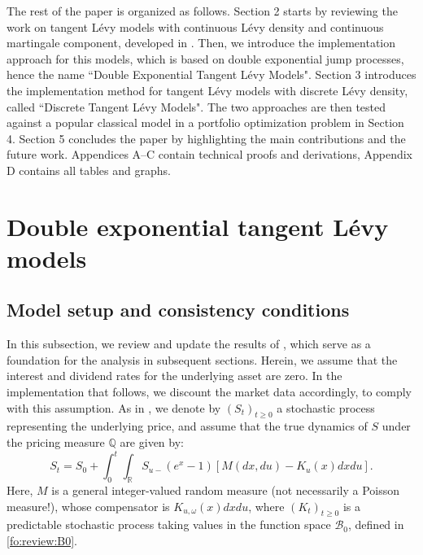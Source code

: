 \documentclass{article}
\numberwithin{equation}{section}
\newcommand\RR {\mathbb R}
\newcommand\QQ {\mathbb Q}
\begin{document}
The rest of the paper is organized as follows. Section 2 starts by reviewing the work on tangent L\'{e}vy models with continuous L\'evy density and continuous martingale component, developed in \cite{carmona2011tangentlevy}. Then, we introduce the implementation approach for this models, which is based on double exponential jump processes, hence the name ``Double Exponential Tangent L\'{e}vy Models". Section 3 introduces the implementation method for tangent L\'{e}vy models with discrete L\'evy density, called ``Discrete Tangent L\'{e}vy Models". The two approaches are then tested against a popular classical model in a portfolio optimization problem in Section 4. Section 5 concludes the paper by highlighting the main contributions and the future work. Appendices A--C contain technical proofs and derivations, Appendix D contains all tables and graphs.








\section{Double exponential tangent L\'{e}vy models}\label{sec:DETLM}


\subsection{Model setup and consistency conditions}\label{sec:nosym}

In this subsection, we review and update the results of \cite{carmona2010tangentlevy}, which serve as a foundation for the analysis in subsequent sections. 
Herein, we assume that the interest and dividend rates for the underlying asset are zero. In the implementation that follows, we discount the market data accordingly, to comply with this assumption. As in \cite{carmona2011tangentlevy}, we denote by $(S_t)_{t\ge 0}$ a stochastic process representing the underlying price, and assume that the true dynamics of $S$ under the pricing measure $\QQ$ are given by:
\begin{equation}
\label{fo:nosym:Sdynamics}
S_t = S_0 + \int_0^t \int_{\RR} S_{u-}(e^x-1)[M(dx,du)-K_u(x)dxdu].
\end{equation}
Here, $M$ is a general integer-valued random measure (not necessarily a Poisson measure!), whose compensator is $K_{u,\omega}(x)dxdu$, where $(K_{t})_{t\ge 0}$ is a predictable stochastic process taking values in the function space $\mathcal{B}_0$, defined in \eqref{fo:review:B0}. 
\end{document}
